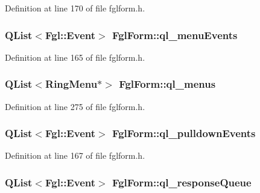 Definition at line 170 of file fglform.h.

\hypertarget{classFglForm_a0a20950e5d9deba35525fbcb7935f6f0}{
\subsubsection[{ql\_\-menuEvents}]{\setlength{\rightskip}{0pt plus 5cm}QList$<${\bf Fgl::Event}$>$ {\bf FglForm::ql\_\-menuEvents}}}
\label{classFglForm_a0a20950e5d9deba35525fbcb7935f6f0}


Definition at line 165 of file fglform.h.

\hypertarget{classFglForm_a587196a08706e03ec05f1fae4048f344}{
\subsubsection[{ql\_\-menus}]{\setlength{\rightskip}{0pt plus 5cm}QList$<${\bf RingMenu}$\ast$$>$ {\bf FglForm::ql\_\-menus}}}
\label{classFglForm_a587196a08706e03ec05f1fae4048f344}


Definition at line 275 of file fglform.h.

\hypertarget{classFglForm_a14b1e58865612b4ebbfa83c8769f9353}{
\subsubsection[{ql\_\-pulldownEvents}]{\setlength{\rightskip}{0pt plus 5cm}QList$<${\bf Fgl::Event}$>$ {\bf FglForm::ql\_\-pulldownEvents}}}
\label{classFglForm_a14b1e58865612b4ebbfa83c8769f9353}


Definition at line 167 of file fglform.h.

\hypertarget{classFglForm_a3aa184c0556d81cfb244f726d95b0538}{
\subsubsection[{ql\_\-responseQueue}]{\setlength{\rightskip}{0pt plus 5cm}QList$<${\bf Fgl::Event}$>$ {\bf FglForm::ql\_\-responseQueue}}}
\label{classFglForm_a3aa184c0556d81cfb244f726d95b0538}


